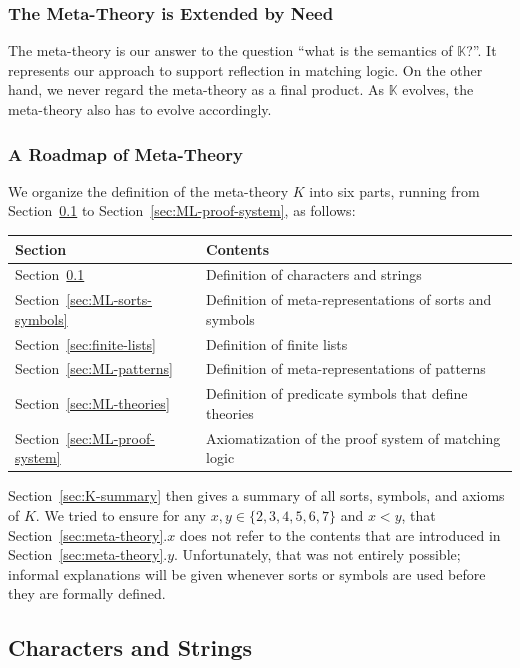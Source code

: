 \documentclass[UTF8,11pt]{article}
\theoremstyle{plain}
\theoremstyle{definition}
\theoremstyle{remark}
\newcommand{\K}{\mbox{$\mathbb{K}$}\xspace}
\begin{document}
\subsubsection{The Meta-Theory is Extended by Need}
The meta-theory is our answer to the question ``what is the semantics of \K?''.
It represents our approach to support reflection in matching logic.
On the other hand, we never regard the meta-theory as a final product.
As \K evolves, the meta-theory also has to evolve accordingly.


\subsubsection{A Roadmap of Meta-Theory}
We organize the definition of the meta-theory $K$ into six
parts, running from Section~\ref{sec:chars-string} to
Section~\ref{sec:ML-proof-system}, as follows:
\begin{center}
\begin{tabular}{l|l}
 \textbf{Section} & \textbf{Contents}
 \\\hline\hline
 Section~\ref{sec:chars-string} & Definition of characters and strings
 \\\hline
 Section~\ref{sec:ML-sorts-symbols} & Definition of meta-representations
 of sorts and symbols
 \\\hline
 Section~\ref{sec:finite-lists} & Definition of finite lists
 \\\hline
 Section~\ref{sec:ML-patterns} & Definition of meta-representations of
 patterns
 \\\hline
 Section~\ref{sec:ML-theories} & Definition of predicate symbols that
 define theories
 \\\hline
 Section~\ref{sec:ML-proof-system} & Axiomatization of the proof system of
 matching logic
 \\\hline
\end{tabular}
\end{center}
Section~\ref{sec:K-summary} then gives a summary of all sorts, symbols, and
axioms of $K$.
We tried to ensure for any $x, y \in \{2,3,4,5,6,7\}$ and $x < y$, that
Section~\ref{sec:meta-theory}.$x$ does not refer to the contents that are
introduced in Section~\ref{sec:meta-theory}.$y$.
Unfortunately, that was not entirely possible;
informal explanations will be given whenever sorts or symbols are used before
they are formally defined.

\subsection{Characters and Strings}
\label{sec:chars-string}
\end{document}
